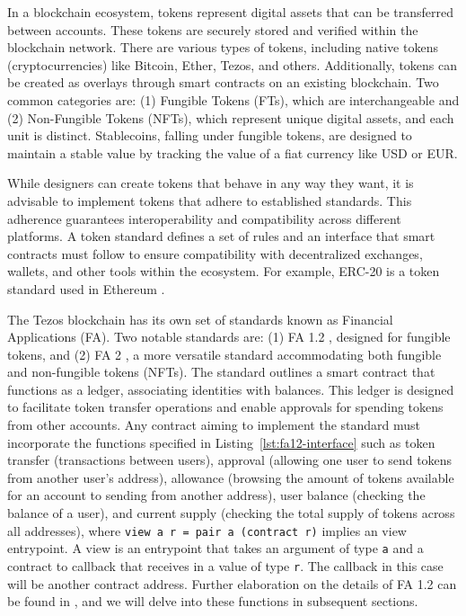\documentclass[a4paper,USenglish,cleveref, autoref,anonymous]{lipics-v2021}
\begin{document}
In a blockchain ecosystem, tokens represent digital assets that can be
transferred between accounts. These tokens are securely stored and
verified within the blockchain network. There are various types of
tokens, including native tokens (cryptocurrencies) like Bitcoin,
Ether, Tezos, and others. Additionally, tokens can be created as
overlays through smart contracts on an existing blockchain. Two common
categories are: (1) Fungible Tokens (FTs), which are interchangeable
and (2) Non-Fungible Tokens (NFTs), which represent unique digital
assets, and each unit is distinct. Stablecoins, falling under fungible
tokens, are designed to maintain a stable value by tracking the value
of a fiat currency like USD or EUR.

While designers can create tokens that behave in any way they want, it
is advisable to implement tokens that adhere to established standards.
This adherence guarantees interoperability and compatibility across
different platforms. A token standard defines a set of rules and an
interface that smart contracts must follow to ensure compatibility
with decentralized exchanges, wallets, and other tools within the
ecosystem. For example, ERC-20 \cite{erc} is a token standard used in Ethereum \cite{eth-whitepaper}.  


The Tezos blockchain has its own set of standards known as Financial
Applications (FA). Two notable standards are: (1) FA 1.2 \cite{fa}, designed for
fungible tokens, and (2) FA 2 \cite{fas}, a more versatile standard accommodating
both fungible and non-fungible tokens (NFTs). The standard outlines a
smart contract that functions as a ledger, associating identities with
balances. This ledger is designed to facilitate token transfer
operations and enable approvals for spending tokens from other
accounts. Any contract aiming to implement the standard must
incorporate the functions specified in
Listing~\ref{lst:fa12-interface} such as token transfer (transactions
between users), approval (allowing one user to send tokens from
another user's address),  allowance (browsing the amount of tokens
available for an account to sending from another address), user
balance (checking the balance of a user), and current supply (checking
the total supply of tokens across all addresses), where
\lstinline/view a r = pair a (contract r)/ implies an view entrypoint.
A view is an entrypoint that takes an
argument of type \lstinline/a/ and a contract to callback that receives in a value
of type \lstinline/r/. The callback in this case will be another
contract address. Further elaboration on the details of FA 1.2 can be
found in \cite{fatzip}, and we will delve into
these functions in subsequent 
sections.
\end{document}
